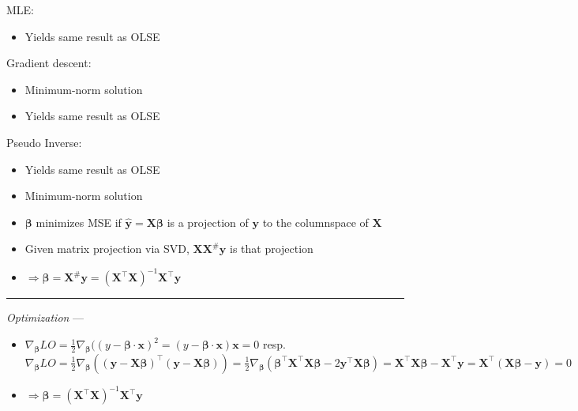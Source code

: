 MLE:
\begin{itemize}
    \item Yields same result as OLSE
\end{itemize}
Gradient descent:
\begin{itemize}
    \item Minimum-norm solution
    \item Yields same result as OLSE
\end{itemize}
Pseudo Inverse:
\begin{itemize}
    \item Yields same result as OLSE
    \item Minimum-norm solution
    \item $\boldsymbol{\beta}$ minimizes MSE if $\hat{\boldsymbol{y}} = \boldsymbol{X}\boldsymbol{\beta}$ is a projection of $\boldsymbol{y}$ to the columnspace of $\boldsymbol{X}$
    \item Given matrix projection via SVD, $\boldsymbol{X} \boldsymbol{X}^{\#} \boldsymbol{y}$ is that projection
    \item $\Rightarrow \boldsymbol{\beta} = \boldsymbol{X}^{\#} \boldsymbol{y} = (\boldsymbol{X}^\intercal \boldsymbol{X})^{-1}  \boldsymbol{X}^\intercal \boldsymbol{y}$
\end{itemize}

{\color{lightgray}\hrule height 0.001mm}

\emph{Optimization} ---
\begin{itemize}
    \item $\nabla_{\boldsymbol{\beta}} LO = \frac{1}{2} \nabla_{\boldsymbol{\beta}} (( y - \boldsymbol{\beta} \cdot \boldsymbol{x})^2 = (y - \boldsymbol{\beta} \cdot \boldsymbol{x})\boldsymbol{x} = 0$
    resp.     
    $\nabla_{\boldsymbol{\beta}} LO = \frac{1}{2} \nabla_{\boldsymbol{\beta}} (( \boldsymbol{y} - \boldsymbol{X}\boldsymbol{\beta})^\intercal( \boldsymbol{y} - \boldsymbol{X}\boldsymbol{\beta} )) = \frac{1}{2} \nabla_{\boldsymbol{\beta}} (\boldsymbol{\beta}^\intercal \boldsymbol{X}^\intercal \boldsymbol{X} \boldsymbol{\beta} - 2 \boldsymbol{y}^\intercal \boldsymbol{X} \boldsymbol{\beta}) = \boldsymbol{X}^\intercal \boldsymbol{X} \boldsymbol{\beta} - \boldsymbol{X}^\intercal \boldsymbol{y} = \boldsymbol{X}^\intercal (\boldsymbol{X} \boldsymbol{\beta} - \boldsymbol{y}) = 0$
    \item $\Rightarrow \boldsymbol{\beta} = (\boldsymbol{X}^\intercal \boldsymbol{X})^{-1}  \boldsymbol{X}^\intercal \boldsymbol{y}$
\end{itemize}

